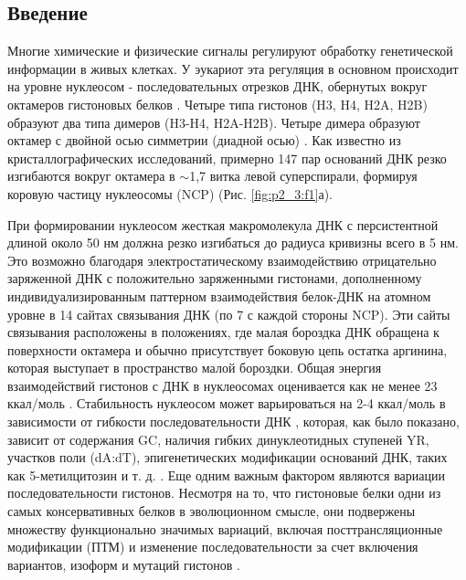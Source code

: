 \subsection{Введение}
Многие химические и физические сигналы регулируют обработку генетической информации в живых клетках.
У эукариот эта регуляция в основном происходит на уровне нуклеосом - последовательных отрезков ДНК, обернутых вокруг октамеров гистоновых белков \cite{kornberg_chromatin_1974,olins_spheroid_1974}. Четыре типа гистонов (H3, H4, H2A, H2B) образуют два типа димеров (H3-H4, H2A-H2B). Четыре димера образуют октамер с двойной осью симметрии (диадной осью) \cite{burlingame_crystallographic_1985}. Как известно из кристаллографических исследований, примерно 147 пар оснований ДНК резко изгибаются вокруг октамера в $\sim$1,7 витка левой суперспирали, формируя коровую частицу нуклеосомы (NCP) \cite{luger_crystal_1997} (Рис. \ref{fig:p2_3:f1}а).

При формировании нуклеосом жесткая макромолекула ДНК с персистентной длиной около 50 нм должна резко изгибаться до радиуса кривизны всего в 5 нм. Это возможно благодаря электростатическому взаимодействию отрицательно заряженной ДНК с положительно заряженными гистонами, дополненному индивидуализированным паттерном взаимодействия белок-ДНК на атомном уровне в 14 сайтах связывания ДНК (по 7 с каждой стороны NCP). Эти сайты связывания расположены в положениях, где малая бороздка ДНК обращена к поверхности октамера и обычно присутствует боковую цепь остатка аргинина, которая выступает в пространство малой бороздки. Общая энергия взаимодействий гистонов с ДНК в нуклеосомах оценивается как не менее 23 ккал/моль \cite{onufriev_nucleosome:_2019}.
Стабильность нуклеосом может варьироваться на 2-4 ккал/моль в зависимости от гибкости последовательности ДНК \cite{thastrom_sequence_1999}, которая, как было показано, зависит от содержания GC, наличия гибких динуклеотидных ступеней YR, участков поли (dA:dT), эпигенетических модификации оснований ДНК, таких как 5-метилцитозин и т. д. \cite{ngo_asymmetric_2015,chua_mechanics_2012,zhurkin_sequence-dependent_1985,segal_genomic_2006}. Еще одним важным фактором являются вариации последовательности гистонов. Несмотря на то, что гистоновые белки одни из самых консервативных белков в эволюционном смысле, они подвержены множеству функционально значимых вариаций, включая посттрансляционные модификации (ПТМ) \cite{zhao_comprehensive_2015} и изменение последовательности за счет включения вариантов, изоформ и мутаций гистонов \cite{draizen_histonedb_2016,singh_replication-dependent_2018,nacev_expanding_2019}.

